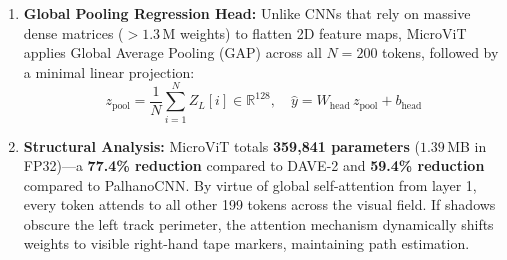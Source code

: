 \documentclass[10pt,journal,compsoc]{IEEEtran}
\begin{document}
\begin{enumerate}
    \begin{equation}
    \text{Attention}(Q, K, V) = \operatorname{softmax}\left(\frac{QK^T}{\sqrt{d_k}}\right)V
    \end{equation}
    \begin{equation}
    Z_\ell' = \text{MHSA}(\text{LayerNorm}(Z_{\ell-1})) + Z_{\ell-1}
    \end{equation}
    \begin{equation}
    Z_\ell = \text{FFN}(\text{LayerNorm}(Z_\ell')) + Z_\ell'
    \end{equation}
    where the Feed-Forward Network (FFN) utilizes an expansion ratio $r = 2.0$ ($d_{\text{ffn}} = 256$) with GELU activations.
    \item \textbf{Global Pooling Regression Head:} Unlike CNNs that rely on massive dense matrices ($>1.3$\,M weights) to flatten 2D feature maps, MicroViT applies Global Average Pooling (GAP) across all $N = 200$ tokens, followed by a minimal linear projection:
    \begin{equation}
    z_{\text{pool}} = \frac{1}{N} \sum_{i=1}^{N} Z_{L}[i] \in \mathbb{R}^{128}, \quad \hat{y} = W_{\text{head}} \, z_{\text{pool}} + b_{\text{head}}
    \end{equation}
    \item \textbf{Structural Analysis:} MicroViT totals \textbf{359,841 parameters} ($1.39$\,MB in FP32)---a \textbf{77.4\% reduction} compared to DAVE-2 and \textbf{59.4\% reduction} compared to PalhanoCNN. By virtue of global self-attention from layer 1, every token attends to all other 199 tokens across the visual field. If shadows obscure the left track perimeter, the attention mechanism dynamically shifts weights to visible right-hand tape markers, maintaining path estimation.
\end{enumerate}
\end{document}
